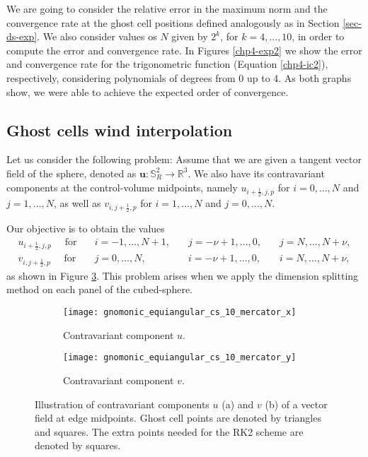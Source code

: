 We are going to consider the relative error in the maximum norm and the convergence rate 
at the ghost cell positions defined analogously as in Section \ref{sec-ds-exp}. 
We also consider values os $N$ given by $2^k$, for $k=4, \ldots, 10$, in order to compute the error and convergence rate.
In Figures \ref{chp4-exp2} we show the error and convergence rate for the trigonometric function (Equation \eqref{chp4-ic2}),
respectively, considering polynomials of degrees from 0 up to 4. As both graphs show, we were able to achieve the expected order of convergence.

\subsection{Ghost cells wind interpolation}
\label{cs-wind-interp}
Let us consider the following problem: Assume that we are given a tangent vector field of the sphere, denoted as 
$\boldsymbol{u}:\mathbb{S}^2_R \to \mathbb{R}^3$. We also have its contravariant components at the control-volume
midpoints, namely $u_{i+\frac{1}{2},j,p}$ for $i=0, \ldots, N$ and $j=1, \ldots, N$, as well as
$v_{i,j+\frac{1}{2},p}$ for $i=1, \ldots, N$ and $j=0, \ldots, N$.

Our objective is to obtain the values 
\begin{align*}
u_{i+\frac{1}{2},j,p} \quad \text{ for} \quad &i=-1, \ldots, N+1, \quad &j=-\nu+1, \ldots, 0, \quad &j=N, \ldots, N+\nu,\\
v_{i,j+\frac{1}{2},p} \quad \text{ for} \quad &j=0, \ldots, N, \quad &i=-\nu+1, \ldots, 0,\quad &i=N, \ldots, N+\nu,
\end{align*}
as shown in Figure \ref{chp4-wind-interp}. This problem arises when we apply the dimension splitting method on each panel of the cubed-sphere.
\begin{figure}[!htb]
	\centering
	\begin{subfigure}{1\textwidth}
		\centering
		\texttt{[image: gnomonic\_equiangular\_cs\_10\_mercator\_x]}
		\caption{Contravariant component $u$. \label{chp4-wind-interp-a}}
	\end{subfigure}
	\begin{subfigure}{1\textwidth}
		\centering
		\texttt{[image: gnomonic\_equiangular\_cs\_10\_mercator\_y]}
		\caption{Contravariant component $v$. \label{chp4-wind-interp-b}}
	\end{subfigure}
	\caption{ Illustration of contravariant components $u$ (a) and $v$ (b) of a vector field at edge midpoints.
		Ghost cell points are denoted by triangles and squares.
		The extra points needed for the RK2 scheme are denoted by squares.\label{chp4-wind-interp}}
\end{figure}


